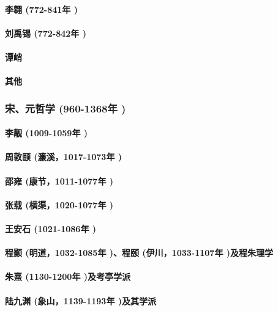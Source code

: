 \documentclass[UTF8]{../RepresentationUniverse}
\begin{document}
        \paragraph{李翱 (772-841年 )}
        \paragraph{刘禹锡 (772-842年 )}
        \paragraph{谭峭}
        \paragraph{其他}

    \subsubsection{宋、元哲学 (960-1368年 )}
        \paragraph{李觏 (1009-1059年 )}
        \paragraph{周敦颐 (濂溪，1017-1073年 )}
        \paragraph{邵雍 (康节，1011-1077年 )}
        \paragraph{张载 (横渠，1020-1077年 )}
        \paragraph{王安石 (1021-1086年 )}
        \paragraph{程颢 (明道，1032-1085年 )、程颐 (伊川，1033-1107年 )及程朱理学}
        \paragraph{朱熹 (1130-1200年 )及考亭学派}
        \paragraph{陆九渊 (象山，1139-1193年 )及其学派}
\end{document}
